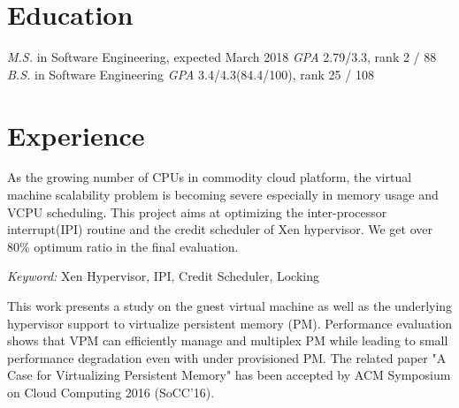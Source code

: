 \documentclass{resume}
\begin{document}


 
\section{Education}
\textit{M.S.} in Software Engineering, expected March 2018
\textit{GPA} 2.79/3.3, rank 2 / 88
\textit{B.S.} in Software Engineering
\textit{GPA} 3.4/4.3(84.4/100), rank 25 / 108



\section{Experience}

As the growing number of CPUs in commodity cloud platform, the virtual machine scalability problem is becoming severe especially in memory usage and VCPU scheduling.
This project aims at optimizing the inter-processor interrupt(IPI) routine and the credit scheduler of Xen hypervisor. We get over 80\% optimum ratio in the final evaluation.

\textit{Keyword: } Xen Hypervisor, IPI, Credit Scheduler, Locking


This work presents a study on the guest virtual machine as well as the underlying hypervisor support to virtualize persistent memory (PM). 
Performance evaluation shows that VPM can efficiently manage and multiplex PM while leading to small performance degradation even with under provisioned PM. 
The related paper "A Case for Virtualizing Persistent Memory" has been accepted by ACM Symposium on Cloud Computing 2016 (SoCC'16).
\end{document}
